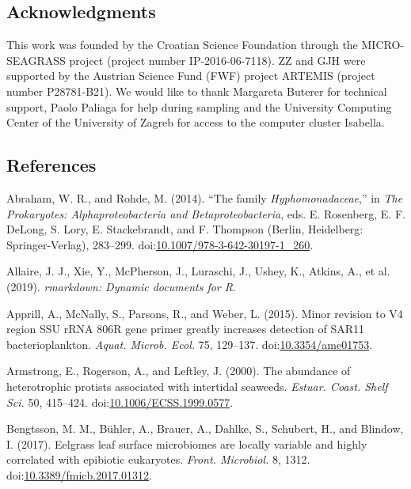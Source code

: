 \documentclass[12pt,]{article}
\begin{document}
\hypertarget{acknowledgments}{%
\subsection{Acknowledgments}\label{acknowledgments}}

This work was founded by the Croatian Science Foundation through the
MICRO-SEAGRASS project (project number IP-2016-06-7118). ZZ and GJH were
supported by the Austrian Science Fund (FWF) project ARTEMIS (project
number P28781-B21). We would like to thank Margareta Buterer for
technical support, Paolo Paliaga for help during sampling and the
University Computing Center of the University of Zagreb for access to
the computer cluster Isabella.

\newpage

\hypertarget{references}{%
\subsection{References}\label{references}}

 \setlength{\emergencystretch}{3.5em}

\hypertarget{refs}{}
\leavevmode\hypertarget{ref-Abraham2014}{}%
Abraham, W. R., and Rohde, M. (2014). ``The family
\emph{Hyphomonadaceae},'' in \emph{The Prokaryotes: Alphaproteobacteria
and Betaproteobacteria}, eds. E. Rosenberg, E. F. DeLong, S. Lory, E.
Stackebrandt, and F. Thompson (Berlin, Heidelberg: Springer-Verlag),
283--299.
doi:\href{https://doi.org/10.1007/978-3-642-30197-1_260}{10.1007/978-3-642-30197-1\_260}.

\leavevmode\hypertarget{ref-Allaire2019}{}%
Allaire, J. J., Xie, Y., McPherson, J., Luraschi, J., Ushey, K., Atkins,
A., et al. (2019). \emph{rmarkdown: Dynamic documents for R}.

\leavevmode\hypertarget{ref-Apprill2015}{}%
Apprill, A., McNally, S., Parsons, R., and Weber, L. (2015). Minor
revision to V4 region SSU rRNA 806R gene primer greatly increases
detection of SAR11 bacterioplankton. \emph{Aquat. Microb. Ecol.} 75,
129--137. doi:\href{https://doi.org/10.3354/ame01753}{10.3354/ame01753}.

\leavevmode\hypertarget{ref-Armstrong2000}{}%
Armstrong, E., Rogerson, A., and Leftley, J. (2000). The abundance of
heterotrophic protists associated with intertidal seaweeds.
\emph{Estuar. Coast. Shelf Sci.} 50, 415--424.
doi:\href{https://doi.org/10.1006/ECSS.1999.0577}{10.1006/ECSS.1999.0577}.

\leavevmode\hypertarget{ref-Bengtsson2017}{}%
Bengtsson, M. M., Bühler, A., Brauer, A., Dahlke, S., Schubert, H., and
Blindow, I. (2017). Eelgrass leaf surface microbiomes are locally
variable and highly correlated with epibiotic eukaryotes. \emph{Front.
Microbiol.} 8, 1312.
doi:\href{https://doi.org/10.3389/fmicb.2017.01312}{10.3389/fmicb.2017.01312}.
\end{document}
